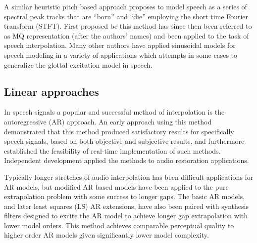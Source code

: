 A similar heuristic pitch based approach proposes to model speech as a series of spectral peak tracks that are ``born'' and ``die'' employing the short time Fourier transform (STFT)\cite{Maher1994}. First proposed be \cite{McAulay1986} this method has since then been referred to as MQ representation (after the authors' names) and been applied to the task of speech interpolation\cite{Maher1994}. Many other authors have applied sinusoidal models for speech modeling in a variety of applications\cite{Godsill1998book}\cite{Vera-Candeas2003}\cite{Wells2006} which attempts in some cases to generalize the glottal excitation model in speech\cite{McAulay1986}.


\subsection{Linear approaches}\label{sec:LitRev_RestorationLin}

In speech signals a popular and successful method of interpolation is the autoregressive (AR) approach\cite{Vaseghi1988thesis}\cite{Godsill1998book}\cite{Kauppinen2002b}. An early approach using this method demonstrated that this method produced satisfactory results for specifically speech signals, based on both objective and subjective results, and furthermore established the feasibility of real-time implementation of such methods\cite{Janssen1986}. Independent development applied the methods to audio restoration applications\cite{Vaseghi1988thesis}\cite{Vaseghi1990}.

Typically longer stretches of audio interpolation has been difficult applications for AR models\cite{Veldhuis1992}\cite{Kauppinen2002b}, but modified AR based models have been applied to the pure extrapolation problem with some success to longer gaps\cite{Kauppinen2002b}. The basic AR models, and later least squares (LS) AR extensions\cite{Godsill1998book}, have also been paired with synthesis filters designed to excite the AR model to achieve longer gap extrapolation with lower model orders\cite{Esquef2006}. This method achieves comparable perceptual quality to higher order AR models given significantly lower model complexity\cite{Esquef2006}.

